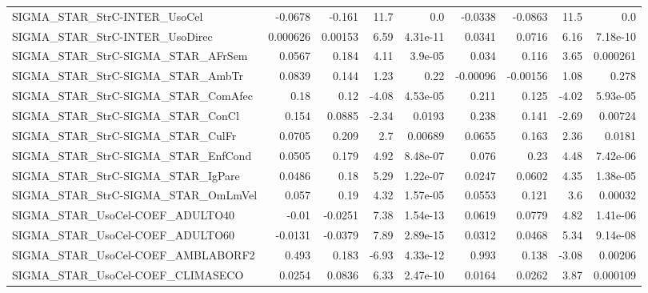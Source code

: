 \begin{tabular}{lrrrrrrrr}
SIGMA\_STAR\_StrC-INTER\_UsoCel           &     -0.0678 &       -0.161 &     11.7 &      0.0 &    -0.0338 &     -0.0863 &         11.5 &           0.0 \\
SIGMA\_STAR\_StrC-INTER\_UsoDirec         &    0.000626 &      0.00153 &     6.59 & 4.31e-11 &     0.0341 &      0.0716 &         6.16 &      7.18e-10 \\
SIGMA\_STAR\_StrC-SIGMA\_STAR\_AFrSem      &      0.0567 &        0.184 &     4.11 &  3.9e-05 &      0.034 &       0.116 &         3.65 &      0.000261 \\
SIGMA\_STAR\_StrC-SIGMA\_STAR\_AmbTr       &      0.0839 &        0.144 &     1.23 &     0.22 &   -0.00096 &    -0.00156 &         1.08 &         0.278 \\
SIGMA\_STAR\_StrC-SIGMA\_STAR\_ComAfec     &        0.18 &         0.12 &    -4.08 & 4.53e-05 &      0.211 &       0.125 &        -4.02 &      5.93e-05 \\
SIGMA\_STAR\_StrC-SIGMA\_STAR\_ConCl       &       0.154 &       0.0885 &    -2.34 &   0.0193 &      0.238 &       0.141 &        -2.69 &       0.00724 \\
SIGMA\_STAR\_StrC-SIGMA\_STAR\_CulFr       &      0.0705 &        0.209 &      2.7 &  0.00689 &     0.0655 &       0.163 &         2.36 &        0.0181 \\
SIGMA\_STAR\_StrC-SIGMA\_STAR\_EnfCond     &      0.0505 &        0.179 &     4.92 & 8.48e-07 &      0.076 &        0.23 &         4.48 &      7.42e-06 \\
SIGMA\_STAR\_StrC-SIGMA\_STAR\_IgPare      &      0.0486 &         0.18 &     5.29 & 1.22e-07 &     0.0247 &      0.0602 &         4.35 &      1.38e-05 \\
SIGMA\_STAR\_StrC-SIGMA\_STAR\_OmLmVel     &       0.057 &         0.19 &     4.32 & 1.57e-05 &     0.0553 &       0.121 &          3.6 &       0.00032 \\
SIGMA\_STAR\_UsoCel-COEF\_ADULTO40        &       -0.01 &      -0.0251 &     7.38 & 1.54e-13 &     0.0619 &      0.0779 &         4.82 &      1.41e-06 \\
SIGMA\_STAR\_UsoCel-COEF\_ADULTO60        &     -0.0131 &      -0.0379 &     7.89 & 2.89e-15 &     0.0312 &      0.0468 &         5.34 &      9.14e-08 \\
SIGMA\_STAR\_UsoCel-COEF\_AMBLABORF2      &       0.493 &        0.183 &    -6.93 & 4.33e-12 &      0.993 &       0.138 &        -3.08 &       0.00206 \\
SIGMA\_STAR\_UsoCel-COEF\_CLIMASECO       &      0.0254 &       0.0836 &     6.33 & 2.47e-10 &     0.0164 &      0.0262 &         3.87 &      0.000109 \\

\end{tabular}
